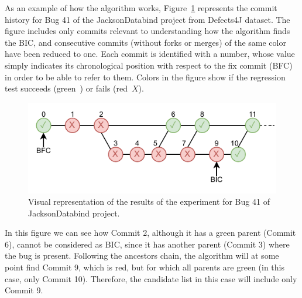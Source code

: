 As an example of how the algorithm works, Figure~\ref{fig:bug41} represents the commit history for Bug 41 of the JacksonDatabind project from Defects4J dataset. 
The figure includes only commits relevant to understanding how the algorithm finds the BIC, and consecutive commits (without forks or merges) of the same color have been reduced to one. 
Each commit is identified with a number, whose value simply indicates its chronological position with respect to the fix commit (BFC) in order to be able to refer to them.
Colors in the figure show if the regression test succeeds (green~\checkmark) or fails (red~$X$).

\begin{figure}[ht!]
  \centering   
  \includegraphics[width=\columnwidth]{pages/03-BugHunter/images/Databind_41.pdf}
  \caption{Visual representation of the results of the experiment for Bug 41 of JacksonDatabind project.}
  \label{fig:bug41}
\end{figure}

In this figure we can see how Commit 2, although it has a green parent (Commit 6), cannot be considered as BIC, since it has another parent (Commit 3) where the bug is present. Following the ancestors chain, the algorithm will at some point find Commit 9, which is red, but for which all parents are green (in this case, only Commit 10). 
Therefore, the candidate list in this case will include only Commit 9.


